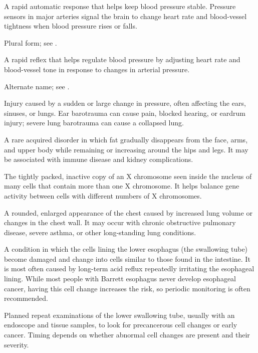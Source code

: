  A rapid automatic response that helps keep blood pressure stable. Pressure sensors in major arteries signal the brain to change heart rate and blood-vessel tightness when blood pressure rises or falls.

 Plural form; see .

 A rapid reflex that helps regulate blood pressure by adjusting heart rate and blood-vessel tone in response to changes in arterial pressure.

 Alternate name; see .

 Injury caused by a sudden or large change in pressure, often affecting the ears, sinuses, or lungs. Ear barotrauma can cause pain, blocked hearing, or eardrum injury; severe lung barotrauma can cause a collapsed lung.

 A rare acquired disorder in which fat gradually disappears from the face, arms, and upper body while remaining or increasing around the hips and legs. It may be associated with immune disease and kidney complications.

 The tightly packed, inactive copy of an X chromosome seen inside the nucleus of many cells that contain more than one X chromosome. It helps balance gene activity between cells with different numbers of X chromosomes.

 A rounded, enlarged appearance of the chest caused by increased lung volume or changes in the chest wall.
It may occur with chronic obstructive pulmonary disease, severe asthma, or other long-standing
lung conditions.

 A condition in which the cells lining the lower esophagus (the swallowing tube) become damaged and change into cells similar to those found in the intestine. It is most often caused by long-term acid reflux repeatedly irritating the esophageal lining. While most people with Barrett esophagus never develop esophageal cancer, having this cell change increases the risk, so periodic monitoring is often recommended.

 Planned repeat examinations of the lower swallowing tube, usually with an endoscope and tissue samples, to look for precancerous cell changes or early cancer. Timing depends on whether abnormal cell changes are present and their severity.

